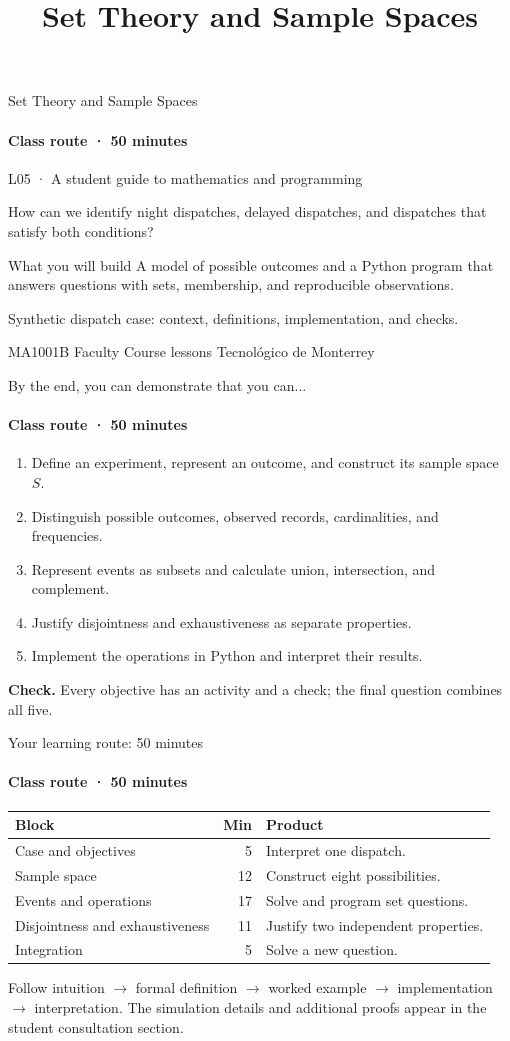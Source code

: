 \documentclass[aspectratio=169,11pt,english]{beamer}
\title[L05 · \ruta]{Set Theory and Sample Spaces}
\newcommand{\objetivo}[1]{{\small\color{TecAzul}#1\par}\medskip}
\newcommand{\checkit}[1]{\par\smallskip\textbf{Check.} #1\par}
\begin{document}
\begin{frame}{Set Theory and Sample Spaces}
  \framesubtitle{Class route · 50 minutes}
  \objetivo{L05 · A student guide to mathematics and programming}
  How can we identify night dispatches, delayed dispatches, and dispatches that
  satisfy both conditions?
  \begin{block}{What you will build}
    A model of possible outcomes and a Python program that answers questions
    with sets, membership, and reproducible observations.
  \end{block}
  Synthetic dispatch case: context, definitions, implementation, and checks.
  \par\medskip
  {\footnotesize MA1001B Faculty \textbar{} Course lessons \textbar{} Tecnol\'ogico de Monterrey}
\end{frame}

\begin{frame}{By the end, you can demonstrate that you can...}
  \framesubtitle{Class route · 50 minutes}
  \begin{enumerate}
    \item Define an experiment, represent an outcome, and construct its sample space $S$.
    \item Distinguish possible outcomes, observed records, cardinalities, and frequencies.
    \item Represent events as subsets and calculate union, intersection, and complement.
    \item Justify disjointness and exhaustiveness as separate properties.
    \item Implement the operations in Python and interpret their results.
  \end{enumerate}
  \checkit{Every objective has an activity and a check; the final question combines all five.}
\end{frame}

\begin{frame}{Your learning route: 50 minutes}
  \framesubtitle{Class route · 50 minutes}
  \begin{tabular}{p{.34\linewidth}rp{.45\linewidth}}
    \toprule Block & Min & Product \\ \midrule
    Case and objectives & 5 & Interpret one dispatch.\\
    Sample space & 12 & Construct eight possibilities.\\
    Events and operations & 17 & Solve and program set questions.\\
    Disjointness and exhaustiveness & 11 & Justify two independent properties.\\
    Integration & 5 & Solve a new question.\\ \bottomrule
  \end{tabular}
  \par\medskip
  Follow intuition $\to$ formal definition $\to$ worked example $\to$ implementation $\to$ interpretation.
  The simulation details and additional proofs appear in the student consultation section.
\end{frame}
\end{document}
